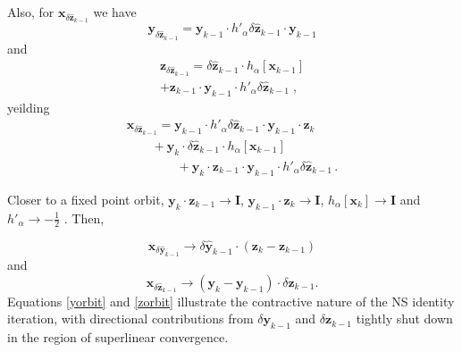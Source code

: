 \documentclass[letterpaper,twocolumn,amsmath,amsfont,amssymb,english,aps,jcp,preprintnumbers,groupaddress,nofootinbib,tightenlines]{revtex4}
\newcommand{\mat}[1]{\boldsymbol{#1}}
\begin{document}
Also, for $\mat{x}_{\delta \widehat{ \mat{z}}_{k-1}}$ we have
\begin{equation}
 \mat{y}_{\delta \widehat{ \mat{z}}_{k-1}} =  {\mat{y}}_{k-1} \cdot  h'_\alpha \delta \widehat{ \mat{z}}_{k-1} \cdot  \mat{y}_{k-1}
\end{equation}
and
\begin{multline}
 \mat{z}_{\delta \widehat{ \mat{z}}_{k-1}} = \delta \widehat{\mat{z}}_{k-1} \cdot   h_\alpha \left[ \mat{x}_{k-1} \right] \\
                                     + \mat{z}_{k-1} \cdot {\mat{y}}_{k-1} \cdot h'_\alpha \delta \widehat{\mat{z}}_{k-1}  \; ,
\end{multline}
yeilding
\begin{multline}
 \mat{x}_{\delta \widehat{ \mat{z}}_{k-1}} =  {\mat{y}}_{k-1} \cdot  h'_\alpha \delta \widehat{ \mat{z}}_{k-1} \cdot  \mat{y}_{k-1}  \cdot \mat{z}_{k} \\
\qquad + \mat{y}_k \cdot  \delta \widehat{\mat{z}}_{k-1} \cdot   h_\alpha \left[ \mat{x}_{k-1} \right] \\
\qquad \qquad +  \mat{y}_{k} \cdot  \mat{z}_{k-1} \cdot {\mat{y}}_{k-1} \cdot h'_\alpha \delta \widehat{\mat{z}}_{k-1} \, .
\end{multline}

Closer to a fixed point orbit,  $\mat{y}_k \cdot \mat{z}_{k-1} \rightarrow \mat{I}$, $\mat{y}_{k-1} \cdot \mat{z}_{k} \rightarrow \mat{I}$,
$h_\alpha \left[ \mat{x}_{k} \right] \rightarrow \mat{I}$ and $h'_\alpha \rightarrow - \frac{1}{2}$ \cite{higham2005}.  Then,

\begin{equation} \label{yorbit}
 \mat{x}_{\delta \widehat{ \mat{y}}_{k-1}} \rightarrow \delta \widehat{\mat{y}}_{k-1} \cdot \left( \mat{z}_k-\mat{z}_{k-1} \right)
\end{equation}
and
\begin{equation} \label{zorbit}
 \mat{x}_{\delta \widehat{ \mat{z}}_{k-1}} \rightarrow \left( \mat{y}_k-\mat{y}_{k-1} \right) \cdot \delta \widehat{\mat{z}}_{k-1} .
\end{equation}
Equations \ref{yorbit} and  \ref{zorbit} illustrate the contractive nature of the NS identity iteration, with directional
contributions from $\delta \mat{y}_{k-1}$ and $\delta \mat{z}_{k-1}$ tightly shut down in the region of superlinear convergence.
\end{document}
